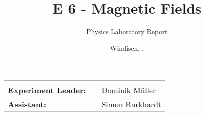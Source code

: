 \documentclass[final]{header/fhnwreport}
\title{\textbf{{\Huge E 6 - Magnetic Fields}}}
\author{{\Huge Physics Laboratory Report}}
\date{{\LARGE Windisch, \the\day.\MONTH \the\year}}
\begin{document}


\maketitle
\vfill
\begin{LARGE}
	\begin{tabularx}{\textwidth}{l p{0cm} X}
		\hline
		& & \\
		\textbf{Experiment Leader:} & & Dominik Müller \\
		\textbf{Assistant:} & & Simon Burkhardt \\
	\end{tabularx}
\end{LARGE}
\clearpage

\tableofcontents
\clearpage







\printbibliography[heading=bibintoc]
\label{sec:literature}

\printglossaries



\ifdraft{
	\newpage
	\listoftodos[\section{To-Do}]
	\clearpage
}
{
}
\end{document}
